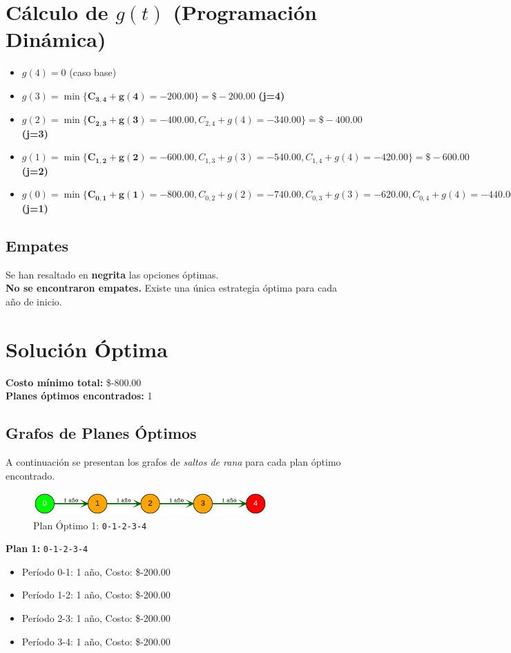 \documentclass[12pt]{article}
\begin{document}
\clearpage
\section*{Cálculo de $g(t)$ (Programación Dinámica)}
\begin{itemize}
\item $g(4) = 0$ (caso base)
\item $g(3) = \min\{ \mathbf{C_{3,4} + g(4) = -200.00}\} = \$-200.00$ \textbf{(j=4)}
\item $g(2) = \min\{ \mathbf{C_{2,3} + g(3) = -400.00}, C_{2,4} + g(4) = -340.00\} = \$-400.00$ \textbf{(j=3)}
\item $g(1) = \min\{ \mathbf{C_{1,2} + g(2) = -600.00}, C_{1,3} + g(3) = -540.00, C_{1,4} + g(4) = -420.00\} = \$-600.00$ \textbf{(j=2)}
\item $g(0) = \min\{ \mathbf{C_{0,1} + g(1) = -800.00}, C_{0,2} + g(2) = -740.00, C_{0,3} + g(3) = -620.00, C_{0,4} + g(4) = -440.00\} = \$-800.00$ \textbf{(j=1)}
\end{itemize}

\subsection*{Empates}
Se han resaltado en \textbf{negrita} las opciones óptimas.\\
\textbf{No se encontraron empates.} Existe una única estrategia óptima para cada año de inicio.\\
\clearpage
\section*{Solución Óptima}
\textbf{Costo mínimo total:} \$-800.00\\
\textbf{Planes óptimos encontrados:} 1
\subsection*{Grafos de Planes Óptimos}
A continuación se presentan los grafos de \emph{saltos de rana} para cada plan óptimo encontrado.

\begin{figure}[H]
\centering
\includegraphics[width=0.8\textwidth]{Reemplazo6x4_plan_1.png}
\caption{Plan Óptimo 1: \texttt{0-1-2-3-4}}
\label{fig:plan1}
\end{figure}

\textbf{Plan 1:} \texttt{0-1-2-3-4}
\begin{itemize}\small
\item Período 0-1: 1 año, Costo: \$-200.00
\item Período 1-2: 1 año, Costo: \$-200.00
\item Período 2-3: 1 año, Costo: \$-200.00
\item Período 3-4: 1 año, Costo: \$-200.00
\end{itemize}
\end{document}
